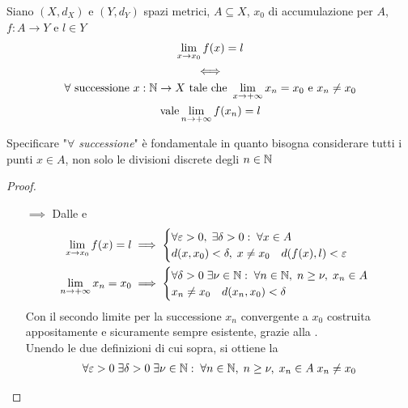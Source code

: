 \begin{proposition}
	\label{prop:funz_cont_per_succ}
	Siano $(X,d_X)$ e $(Y,d_Y)$ spazi metrici, $A \subseteq X$, $x_0$ di accumulazione per $A$, $f: A \to Y$ e $l \in Y$
	\begin{equation*}
		\begin{gathered}
			\lim\limits_{x \to x_0} f(x) = l\\
			\iff\\
			\forall \text{ successione } x: \mathbb{N} \to X \text{ tale che } \lim\limits_{x \to +\infty} x_n = x_0 \text{ e } x_n \neq x_0\\
			\text{vale} \lim\limits_{n \to +\infty} f(x_n) = l
		\end{gathered}
	\end{equation*}
	\begin{note}
		Specificare "\textit{$\forall$ successione}" è fondamentale in quanto bisogna considerare tutti i punti $x \in A$, non solo le divisioni discrete degli $n \in \mathbb{N}$
	\end{note}
	\begin{proof}~
		\begin{itemize}
			\item[$\implies$] Dalle  e 
				\begin{align*}
					\lim\limits_{x \to x_0} f(x) = l &\implies
					\begin{cases}
						\forall \varepsilon > 0,\; \exists \delta > 0:\; \forall x \in A\;\\
						d(x,x_0) < \delta,\; x \neq x_0 \quad d(f(x),l)<\varepsilon
					\end{cases}\\
					\lim\limits_{n \to +\infty} x_n = x_0 &\implies
					\begin{cases}
						\forall \delta > 0\; \exists \nu \in \mathbb{N}:\; \forall n \in \mathbb{N},\; n \geq \nu,\; x_n \in A\\
						x_n \neq x_0 \quad d(x_n, x_0) < \delta
					\end{cases}
				\end{align*}
				Con il secondo limite per la successione $x_n$ convergente a $x_0$ costruita appositamente e sicuramente sempre esistente, grazie alla .\\
				Unendo le due definizioni di cui sopra, si ottiene la
				\begin{equation*}
					\begin{gathered}
						\forall \varepsilon > 0\; \exists \delta > 0\; \exists \nu \in \N:\; \forall n \in \N,\; n \geq \nu,\; x_n \in A\; x_n \neq x_0\\

\end{gathered}
\end{equation*}
\end{itemize}
\end{proof}
\end{proposition}
